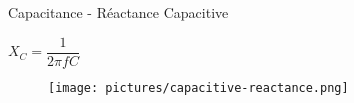 \begin{frame}{Capacitance - Réactance Capacitive}
    \begin{center}
        \Large{
            $X_C = \dfrac{1}{2 \pi f C}$
        }
        \vspace{15pt}
        \begin{figure}
            \centering
            \texttt{[image: pictures/capacitive-reactance.png]}
        \end{figure}
    \end{center}
\end{frame}

%






